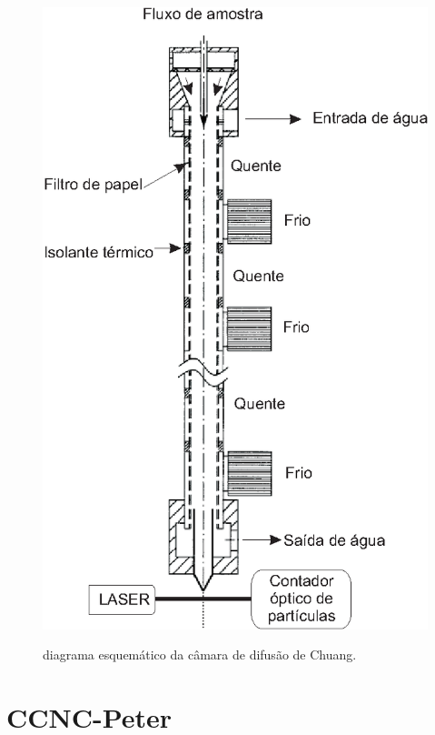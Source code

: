 \begin{figure}[!hbt]
\begin{center}
\includegraphics[scale=0.8]{eps/caltech.eps}\\
\end{center}
\caption{\label{caltech}\hspace{-0.1em} diagrama esquem\'{a}tico da c\^{a}mara de difus\~{a}o de Chuang.}
\end{figure}

\newpage


\section{CCNC-Peter}

